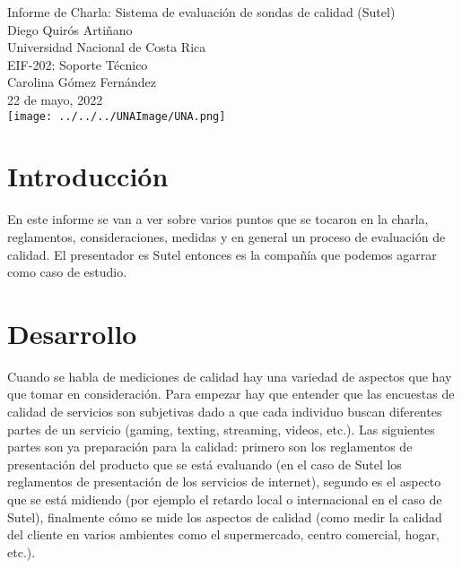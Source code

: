 \documentclass[stu, 12pt, letterpaper, donotrepeattitle, floatsintext, natbib, helv]{apa7}
\begin{document}
\begin{titlepage}
    \centering
    \vfill
    \LARGE Informe de Charla: Sistema de evaluación de sondas de calidad (Sutel)\\
    \vskip2cm
    \large Diego Quirós Artiñano \\
    Universidad Nacional de Costa Rica \\
    EIF-202: Soporte Técnico \\ 
    Carolina Gómez Fernández \\
    22 de mayo, 2022 \\
    \vfill
    \texttt{[image: ../../../UNAImage/UNA.png]} \\
    \vfill
    \vfill
\end{titlepage}

\addto{}
\tableofcontents
\setcounter{tocdepth}{2}
\newpage


\section*{Introducción}
{}

\quad En este informe se van a ver sobre varios puntos que se tocaron en la charla, reglamentos, consideraciones, medidas y en general un proceso de evaluación de calidad. El presentador es Sutel entonces es la compañía que podemos agarrar como caso de estudio.

\section*{Desarrollo}
{}

\quad Cuando se habla de mediciones de calidad hay una variedad de aspectos que hay que tomar en consideración. Para empezar hay que entender que las encuestas de calidad de servicios son subjetivas dado a que cada individuo buscan diferentes partes de un servicio (gaming, texting, streaming, videos, etc.). Las siguientes partes son ya preparación para la calidad: primero son los reglamentos de presentación del producto que se está evaluando (en el caso de Sutel los reglamentos de presentación de los servicios de internet), segundo es el aspecto que se está midiendo (por ejemplo el retardo local o internacional en el caso de Sutel), finalmente cómo se mide los aspectos de calidad (como medir la calidad del cliente en varios ambientes como el supermercado, centro comercial, hogar, etc.). 
\end{document}
